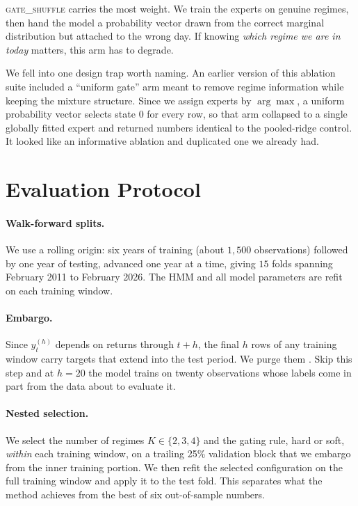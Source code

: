 \documentclass[sigconf,nonacm]{acmart}
\begin{document}
\textsc{gate\_shuffle} carries the most weight. We train the experts on genuine
regimes, then hand the model a probability vector drawn from the correct marginal
distribution but attached to the wrong day. If knowing \emph{which regime we are
in today} matters, this arm has to degrade.

We fell into one design trap worth naming. An earlier version of this ablation
suite included a ``uniform gate'' arm meant to remove regime information while
keeping the mixture structure. Since we assign experts by $\arg\max$, a uniform
probability vector selects state $0$ for every row, so that arm collapsed to a
single globally fitted expert and returned numbers identical to the pooled-ridge
control. It looked like an informative ablation and duplicated one we already
had.

\section{Evaluation Protocol}
\label{sec:protocol-def}

\paragraph{Walk-forward splits.}
We use a rolling origin: six years of training (about $1{,}500$ observations)
followed by one year of testing, advanced one year at a time, giving $15$ folds
spanning February 2011 to February 2026. The HMM and all model parameters are
refit on each training window.

\paragraph{Embargo.}
Since $y_t^{(h)}$ depends on returns through $t+h$, the final $h$ rows of any
training window carry targets that extend into the test period. We purge them
\cite{lopezdeprado2018}. Skip this step and at $h=20$ the model trains on twenty
observations whose labels come in part from the data about to evaluate it.

\paragraph{Nested selection.}
We select the number of regimes $K \in \{2,3,4\}$ and the gating rule, hard or
soft, \emph{within} each training window, on a trailing 25\% validation block
that we embargo from the inner training portion. We then refit the selected
configuration on the full training window and apply it to the test fold. This
separates what the method achieves from the best of six out-of-sample numbers.
\end{document}
